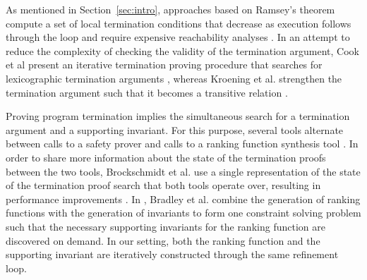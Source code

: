 \documentclass[preprint]{sigplanconf}
\theoremstyle{definition}
\begin{document}
As mentioned in Section~\ref{sec:intro}, approaches based on Ramsey's theorem compute a set of local termination conditions that decrease as execution follows through the loop
and require expensive reachability analyses
\cite{DBLP:conf/lpe/CodishG03,DBLP:conf/lics/PodelskiR04,DBLP:conf/pldi/CookPR06}.
In an attempt to reduce the complexity of checking the validity of the termination argument, 
Cook et al present an iterative termination proving procedure that searches for 
lexicographic termination arguments \cite{DBLP:conf/tacas/CookSZ13}, 
whereas Kroening et al. strengthen the termination argument such that it becomes a transitive relation \cite{DBLP:conf/cav/KroeningSTW10}.

Proving program termination implies the simultaneous search for a termination argument and a supporting invariant.
For this purpose, several tools alternate 
between calls to a safety prover and calls to a ranking function synthesis tool \cite{}. 
In order to share more information about the state of the termination proofs between the two tools, 
Brockschmidt et al. use a single representation of the state of the termination proof search that both tools operate over, 
resulting in performance improvements \cite{DBLP:conf/cav/BrockschmidtCF13}.
In \cite{DBLP:conf/cav/BradleyMS05}, Bradley et al. combine the generation of ranking functions with the generation of invariants to
form one constraint solving problem such that the necessary supporting invariants for the ranking function are discovered on demand.
In our setting, both the ranking function and the supporting invariant are iteratively constructed through the same refinement loop.

 


\end{document}
